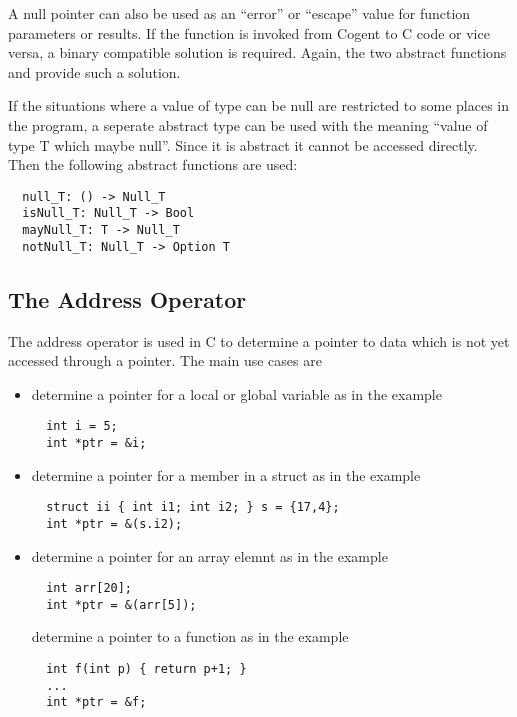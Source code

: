 A null pointer can also be used as an ``error'' or ``escape'' value for function parameters or results. If the function is
invoked from Cogent to C code or vice versa, a binary compatible solution is required. Again, the two abstract functions 
 and  provide such a solution.

If the situations where a value of type  can be null are restricted to some places in the program, a seperate abstract
type  can be used with the meaning ``value of type T which maybe null''. Since it is abstract it cannot be
accessed directly. Then the following abstract functions are used:
\begin{verbatim}
  null_T: () -> Null_T
  isNull_T: Null_T -> Bool
  mayNull_T: T -> Null_T
  notNull_T: Null_T -> Option T
\end{verbatim}

\subsection{The Address Operator \code{\&}}
\label{app-trans-addrop}

The address operator \code{\&} is used in C to determine a pointer to data which is not yet accessed through a 
pointer. The main use cases are
\begin{itemize}
\item determine a pointer for a local or global variable as in the example
\begin{verbatim}
  int i = 5;
  int *ptr = &i;
\end{verbatim}

\item determine a pointer for a member in a struct as in the example
\begin{verbatim}
  struct ii { int i1; int i2; } s = {17,4};
  int *ptr = &(s.i2);
\end{verbatim}

\item determine a pointer for an array elemnt as in the example
\begin{verbatim}
  int arr[20];
  int *ptr = &(arr[5]);
\end{verbatim}

determine a pointer to a function as in the example
\begin{verbatim}
  int f(int p) { return p+1; }
  ...
  int *ptr = &f;
\end{verbatim}
\end{itemize}

